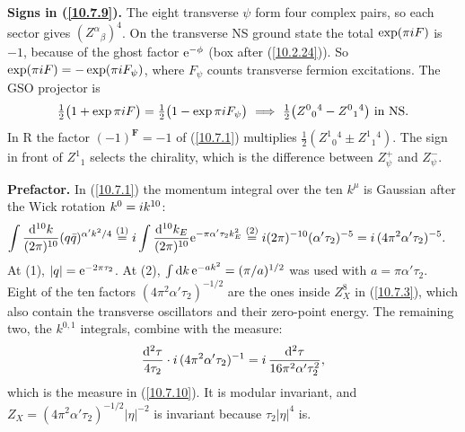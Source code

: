 	\begin{tcolorbox}[breakable]
		\begin{remark}
			\textbf{Signs in (\ref{10.7.9}).} The eight transverse $\psi$ form four complex pairs, so each sector gives $(Z^{\alpha}{}_{\beta})^{4}$. On the transverse NS ground state the total $\exp(\pi i F)$ is $-1$, because of the ghost factor $\mathrm{e}^{-\phi}$ (box after (\ref{10.2.24})). So $\exp(\pi i F)=-\exp(\pi i F_\psi)$, where $F_\psi$ counts transverse fermion excitations. The GSO projector is
			\begin{equation*}
				\tfrac12\bigl(1+\exp\pi\mi F\bigr)=\tfrac12\bigl(1-\exp\pi\mi F_\psi\bigr)\ \Longrightarrow\ \tfrac12\bigl(Z^0{}_0{}^{4}-Z^0{}_1{}^{4}\bigr)\ \text{in NS}.
			\end{equation*}
			In R the factor $(-1)^{\mathbf F}=-1$ of (\ref{10.7.1}) multiplies $\tfrac12(Z^1{}_0{}^4\pm Z^1{}_1{}^4)$. The sign in front of $Z^1{}_1$ selects the chirality, which is the difference between $Z^+_\psi$ and $Z^-_\psi$.

			\textbf{Prefactor.} In (\ref{10.7.1}) the momentum integral over the ten $k^\mu$ is Gaussian after the Wick rotation $k^0=i k^{10}$:
			\begin{align*}
				\int\frac{\mathrm{d}^{10}k}{(2\pi)^{10}}(q\bar q)^{\alpha'k^{2}/4}
				&\overset{(1)}{=}i\int\frac{\mathrm{d}^{10}k_E}{(2\pi)^{10}}\mathrm{e}^{-\pi\alpha'\tau_2k_E^{2}}
				\overset{(2)}{=}i(2\pi)^{-10}(\alpha'\tau_2)^{-5}=i\,(4\pi^{2}\alpha'\tau_2)^{-5} .
			\end{align*}
			At (1), $|q|=\mathrm{e}^{-2\pi\tau_2}$. At (2), $\int\mathrm{d} k\,\mathrm{e}^{-ak^{2}}=(\pi/a)^{1/2}$ was used with $a=\pi\alpha'\tau_2$. Eight of the ten factors $(4\pi^{2}\alpha'\tau_2)^{-1/2}$ are the ones inside $Z_X^{8}$ in (\ref{10.7.3}), which also contain the transverse oscillators and their zero-point energy. The remaining two, the $k^{0,1}$ integrals, combine with the measure:
			\begin{equation*}
				\frac{\mathrm{d}^{2}\tau}{4\tau_2}\cdot i\,(4\pi^{2}\alpha'\tau_2)^{-1}=i\,\frac{\mathrm{d}^{2}\tau}{16\pi^{2}\alpha'\tau_2^{2}} ,
			\end{equation*}
			which is the measure in (\ref{10.7.10}). It is modular invariant, and $Z_X=(4\pi^{2}\alpha'\tau_2)^{-1/2}|\eta|^{-2}$ is invariant because $\tau_2|\eta|^{4}$ is.
		\end{remark}
	\end{tcolorbox}
	
